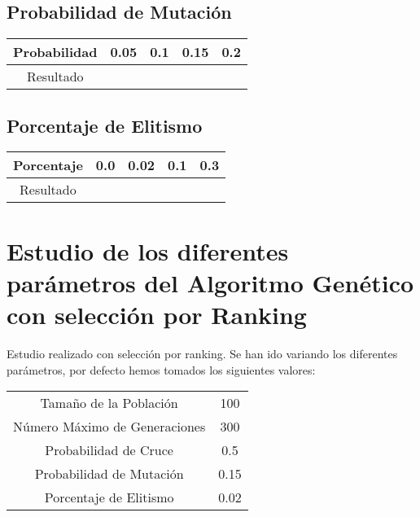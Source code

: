 \documentclass[12pt]{article}
\begin{document}
	

\subsection{Probabilidad de Mutación}
\begin{table}[H]
\begin{center}
\begin{tabular}{|ccccc|} \hline
Probabilidad   & 0.05 & 0.1 & 0.15 & 0.2 \\  \hline
Resultado  &   &  &  &  \\ \hline
\end{tabular}
\end{center}
\end{table}

	

\subsection{Porcentaje de Elitismo}
\begin{table}[H]
\begin{center}
\begin{tabular}{|ccccc|} \hline
Porcentaje   & 0.0 & 0.02 & 0.1 & 0.3 \\  \hline
Resultado  &   &  &  &  \\ \hline
\end{tabular}
\end{center}
\end{table}


\section{Estudio de los diferentes parámetros del Algoritmo Genético con selección por Ranking}

	Estudio realizado con selección por ranking. Se han ido variando los diferentes parámetros, por defecto hemos tomados los siguientes valores:

\begin{table}[H]
\begin{center}
\begin{tabular}{|cc|} \hline
Tamaño de la Población   & 100  \\  
Número Máximo de Generaciones  &  300 \\
Probabilidad de Cruce & 0.5 \\
Probabilidad de Mutación & 0.15 \\
Porcentaje de Elitismo & 0.02 \\ \hline
\end{tabular}
\end{center}
\end{table}
\end{document}
